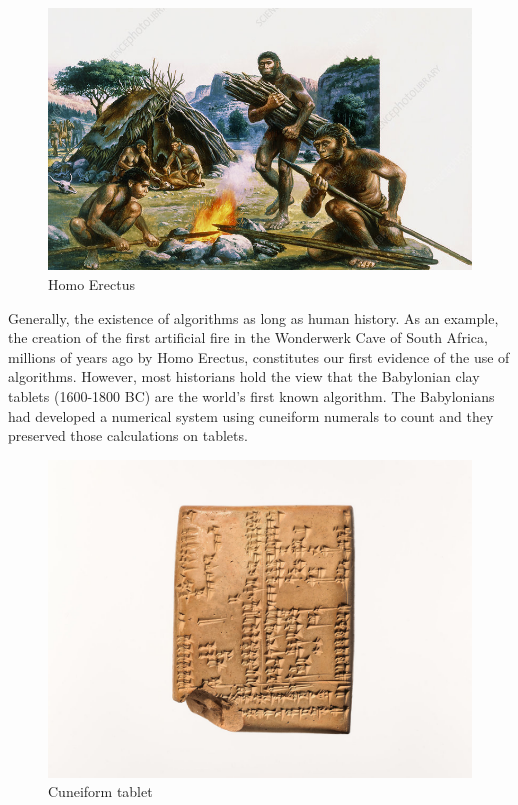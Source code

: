 \begin{figure}[h]
    \centering
    \includegraphics[scale=0.4]{figures/homo_erectus.jpg}
    \caption{Homo Erectus}
    \label{fig:gp}
\end{figure}

Generally, the existence of algorithms as long as human history. As an example, the creation of the first artificial fire in the Wonderwerk Cave of South Africa, millions of years ago by Homo Erectus, constitutes our first evidence of the use of algorithms. However, most historians hold the view that the Babylonian clay tablets (1600-1800 BC) are the world's first known algorithm. The Babylonians had developed a numerical system using cuneiform numerals to count and they preserved those calculations on tablets. \\ 

\begin{figure}[h]
    \centering
    \includegraphics{figures/tablet.jpg}
    \caption{Cuneiform tablet}
    \label{fig:gp}
\end{figure}

